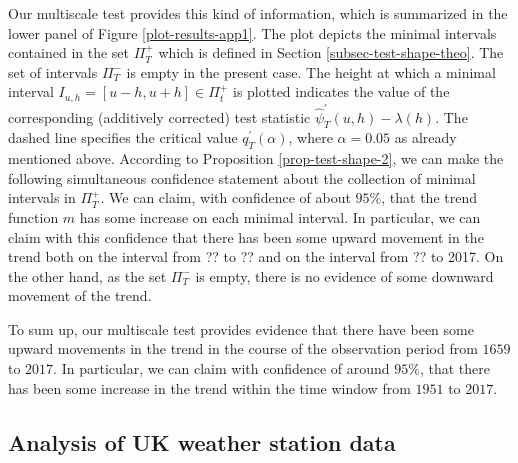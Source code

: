 Our multiscale test provides this kind of information, which is summarized in the lower panel of Figure \ref{plot-results-app1}. The plot depicts the minimal intervals contained in the set $\Pi_T^+$ which is defined in Section \ref{subsec-test-shape-theo}. The set of intervals $\Pi_T^-$ is empty in the present case. The height at which a minimal interval $I_{u,h} = [u-h,u+h] \in \Pi_t^+$ is plotted indicates the value of the corresponding (additively corrected) test statistic $\widehat{\psi}^\prime_T(u,h) - \lambda(h)$. The dashed line specifies the critical value $q_T^\prime(\alpha)$, where $\alpha = 0.05$ as already mentioned above. According to Proposition \ref{prop-test-shape-2}, we can make the following simultaneous confidence statement about the collection of minimal intervals in $\Pi_T^+$. We can claim, with confidence of about $95\%$, that the trend function $m$ has some increase on each minimal interval. In particular, we can claim with this confidence that there has been some upward movement in the trend both on the interval from ?? to ?? and on the interval from ?? to 2017. 
On the other hand, as the set $\Pi_T^-$ is empty, there is no evidence of some downward movement of the trend.  


To sum up, our multiscale test provides evidence that there have been some upward movements in the trend in the course of the observation period from $1659$ to $2017$. In particular, we can claim with confidence of around $95\%$, that there has been some increase in the trend within the time window from $1951$ to $2017$. 




\subsection{Analysis of UK weather station data}\label{subsec-data-2} 
